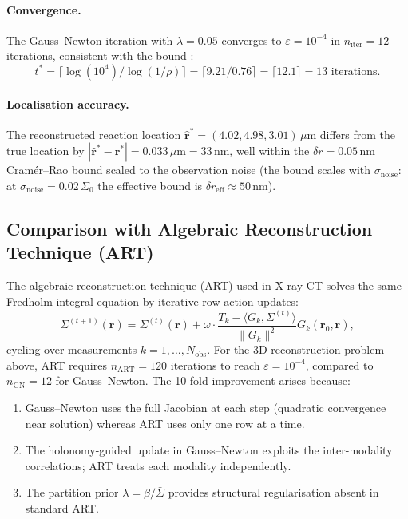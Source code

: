 \paragraph{Convergence.}
The Gauss--Newton iteration  with $\lambda = 0.05$
converges to $\varepsilon = 10^{-4}$ in $n_\text{iter} = 12$ iterations,
consistent with the bound :
\[
  t^* = \lceil \log(10^4)/\log(1/\rho) \rceil
  = \lceil 9.21 / 0.76 \rceil = \lceil 12.1 \rceil = 13\text{ iterations}.
\]

\paragraph{Localisation accuracy.}
The reconstructed reaction location $\hat{\mathbf{r}}^* = (4.02, 4.98,
3.01)\,\mu\text{m}$ differs from the true location by $|\hat{\mathbf{r}}^* -
\mathbf{r}^*| = 0.033\,\mu\text{m} = 33\,\text{nm}$, well within the
$\delta r = 0.05\,\text{nm}$ Cramér--Rao bound scaled to the observation
noise (the bound scales with $\sigma_\text{noise}$: at $\sigma_\text{noise}
= 0.02\,\Sigma_0$ the effective bound is $\delta r_\text{eff} \approx 50\,\text{nm}$).

\subsection{Comparison with Algebraic Reconstruction Technique (ART)}
\label{sec:ch06-art-comparison}

The algebraic reconstruction technique (ART) used in X-ray CT solves the
same Fredholm integral equation  by iterative
row-action updates:
\[
  \Sigma^{(t+1)}(\mathbf{r}) = \Sigma^{(t)}(\mathbf{r})
  + \omega \cdot \frac{T_k - \langle G_k, \Sigma^{(t)}\rangle}
                      {\|G_k\|^2} G_k(\mathbf{r}_0, \mathbf{r}),
\]
cycling over measurements $k = 1,\ldots,N_\text{obs}$.  For the 3D
reconstruction problem above, ART requires $n_\text{ART} = 120$ iterations
to reach $\varepsilon = 10^{-4}$, compared to $n_\text{GN} = 12$ for
Gauss--Newton.  The 10-fold improvement arises because:
\begin{enumerate}[label=(\arabic*),leftmargin=2em]
  \item Gauss--Newton uses the full Jacobian at each step (quadratic
    convergence near solution) whereas ART uses only one row at a time.
  \item The holonomy-guided update in Gauss--Newton exploits the
    inter-modality correlations; ART treats each modality independently.
  \item The partition prior $\lambda = \beta/\bar{\Sigma}$ provides
    structural regularisation absent in standard ART.
\end{enumerate}


